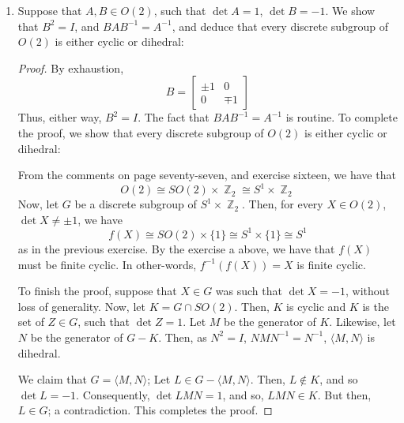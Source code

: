 \documentclass{book}
\DeclareMathOperator*{\Z}{\mathbb{Z}}
\begin{document}
\begin{enumerate}[(1)]
    \item Suppose that $A,B \in O(2)$, such that $\det A  = 1$, $\det B = -1$. We show that $B^2 = I$, and $BAB^{-1} = A^{-1}$, and deduce that every discrete subgroup of $O(2)$ is either cyclic or dihedral: 
        \begin{proof} By exhaustion, 
            \[ B = 
            \begin{bmatrix}
                \pm1 & 0 \\
                0 & \mp1
            \end{bmatrix} 
            \]
            Thus, either way, $B^2 = I$. The fact that $BAB^{-1} = A^{-1}$ is routine. To complete the proof, we show that every discrete subgroup of $O(2)$ is either cyclic or dihedral:  
            \par From the comments on page seventy-seven, and exercise sixteen, we have that 
            \[O(2) \cong SO(2) \times \Z_2 \cong S^1 \times \Z_2\]
            Now, let $G$ be a discrete subgroup of $S^1 \times \Z_2$. Then, for every $X \in O(2)$, $\det X \neq \pm 1$, we have 
            \[f(X) \cong SO(2) \times \{1\} \cong S^1 \times \{1\} \cong S^1\]
            as in the previous exercise. By the exercise a above, we have that $f(X)$ must be finite cyclic. In other-words, $f^{-1}(f(X)) = X$ is finite cyclic. 
            \par To finish the proof, suppose that $X \in G$ was such that $\det X = -1$, without loss of generality. Now, let $K = G \cap SO(2)$. Then, $K$ is cyclic and $K$ is the set of $Z \in G$, such that $\det Z = 1$. Let $M$ be the generator of $K$. Likewise, let $N$ be the generator of $G-K$. Then, as $N^2 = I$, $NMN^{-1} = N^{-1}$, $\langle M, N \rangle$ is dihedral. 
            \par We claim that $G = \langle M, N \rangle$; Let $L \in G - \langle M, N \rangle$. Then, $L \notin K$, and so $\det L = -1$. Consequently, $\det LMN = 1$, and so, $LMN \in K$. But then, $L \in G$; a contradiction. This completes the proof.
        \end{proof}


\end{enumerate}
\end{document}
